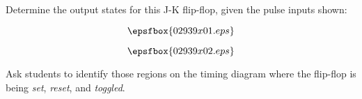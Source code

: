 

Determine the output states for this J-K flip-flop, given the pulse inputs shown:

$$\epsfbox{02939x01.eps}$$







$$\epsfbox{02939x02.eps}$$







Ask students to identify those regions on the timing diagram where the flip-flop is being {\it set}, {\it reset}, and {\it toggled}.





